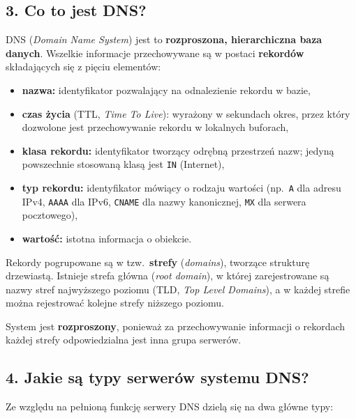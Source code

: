\documentclass[12pt,a4paper]{article}
\begin{document}
\subsection*{3. Co to jest DNS?}

DNS (\emph{Domain Name System}) jest to \textbf{rozproszona, hierarchiczna baza
danych}. Wszelkie informacje przechowywane są w postaci \textbf{rekordów}
składających się z pięciu elementów:
\begin{itemize}
  \item \textbf{nazwa:} identyfikator pozwalający na odnalezienie rekordu w bazie,
  \item \textbf{czas życia} (TTL, \emph{Time To Live}): wyrażony w sekundach
        okres, przez który dozwolone jest przechowywanie rekordu w lokalnych buforach,
  \item \textbf{klasa rekordu:} identyfikator tworzący odrębną przestrzeń nazw;
        jedyną powszechnie stosowaną klasą jest \texttt{IN} (Internet),
  \item \textbf{typ rekordu:} identyfikator mówiący o rodzaju wartości (np.\
        \texttt{A} dla adresu IPv4, \texttt{AAAA} dla IPv6, \texttt{CNAME} dla
        nazwy kanonicznej, \texttt{MX} dla serwera pocztowego),
  \item \textbf{wartość:} istotna informacja o obiekcie.
\end{itemize}

Rekordy pogrupowane są w tzw.\ \textbf{strefy} (\emph{domains}), tworzące strukturę
drzewiastą. Istnieje strefa główna (\emph{root domain}), w której zarejestrowane są
nazwy stref najwyższego poziomu (TLD, \emph{Top Level Domains}), a w każdej strefie
można rejestrować kolejne strefy niższego poziomu.

System jest \textbf{rozproszony}, ponieważ za przechowywanie informacji o rekordach
każdej strefy odpowiedzialna jest inna grupa serwerów.

\subsection*{4. Jakie są typy serwerów systemu DNS?}

Ze względu na pełnioną funkcję serwery DNS dzielą się na dwa główne typy:
\end{document}
